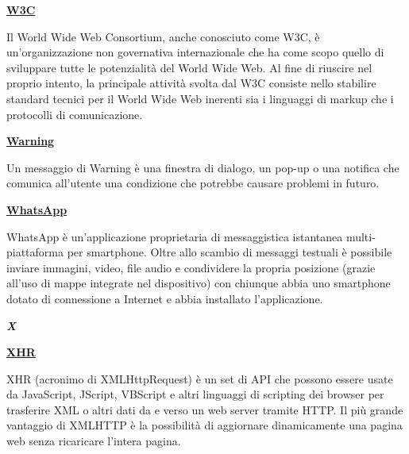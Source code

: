 \begin{addmargin}[0em]{0em}
	\textbf{\underline{W3C}}
\end{addmargin}

\medskip
\begin{addmargin}[5em]{1em}
Il World Wide Web Consortium, anche conosciuto come W3C, è un'organizzazione non governativa internazionale che ha come scopo quello di sviluppare tutte le potenzialità del World Wide Web. Al fine di riuscire nel proprio intento, la principale attività svolta dal W3C consiste nello stabilire standard tecnici per il World Wide Web inerenti sia i linguaggi di markup che i protocolli di comunicazione.
\end{addmargin}

\bigskip
\begin{addmargin}[0em]{0em}
	\textbf{\underline{Warning}}
\end{addmargin} 

\medskip
\begin{addmargin}[5em]{1em}
Un messaggio di Warning è una finestra di dialogo, un pop-up o una notifica che comunica all'utente una condizione che potrebbe causare problemi in futuro.
\end{addmargin}
	
\bigskip
\begin{addmargin}[0em]{0em}
	\textbf{\underline{WhatsApp}}
\end{addmargin} 

\medskip
\begin{addmargin}[5em]{1em}
WhatsApp è un'applicazione proprietaria di messaggistica istantanea multi-piattaforma per smartphone. Oltre allo scambio di messaggi testuali è possibile inviare immagini, video, file audio e condividere la propria posizione (grazie all'uso di mappe integrate nel dispositivo) con chiunque abbia uno smartphone dotato di connessione a Internet e abbia installato l'applicazione.
\end{addmargin}

\newpage

\cleardoublepage
{}
{}
\noindent\hrulefill\hspace{4mm}\textbf{\textsl{\Huge{X}}}\hspace{4mm}\hrulefill
\vspace*{2\bigskipamount}

\begin{addmargin}[0em]{0em}
	\textbf{\underline{XHR}}
\end{addmargin} 

\medskip
\begin{addmargin}[5em]{1em}
 XHR (acronimo di XMLHttpRequest) è un set di API che possono essere usate da JavaScript, JScript, VBScript e altri linguaggi di scripting dei browser per trasferire XML o altri dati da e verso un web server tramite HTTP. Il più grande vantaggio di XMLHTTP è la possibilità di aggiornare dinamicamente una pagina web senza ricaricare l'intera pagina.
\end{addmargin}

		
